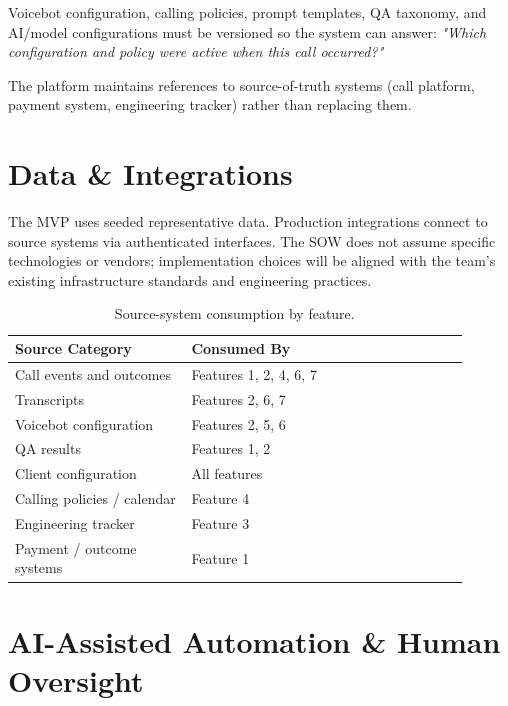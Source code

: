 \documentclass[11pt,a4paper]{article}
\begin{document}
Voicebot configuration, calling policies, prompt templates, QA taxonomy, and AI/model configurations must be versioned so the system can answer: \emph{"Which configuration and policy were active when this call occurred?"}

The platform maintains references to source-of-truth systems (call platform, payment system, engineering tracker) rather than replacing them.

\section{Data \& Integrations}

The MVP uses seeded representative data. Production integrations connect to source systems via authenticated interfaces. The SOW does not assume specific technologies or vendors; implementation choices will be aligned with the team's existing infrastructure standards and engineering practices.

\begin{table}[H]
\centering
\small
\begin{tabular}{p{0.35\linewidth}p{0.55\linewidth}}
\toprule
\textbf{Source Category} & \textbf{Consumed By} \\
\midrule
Call events and outcomes    & Features 1, 2, 4, 6, 7 \\
Transcripts                 & Features 2, 6, 7 \\
Voicebot configuration      & Features 2, 5, 6 \\
QA results                  & Features 1, 2 \\
Client configuration        & All features \\
Calling policies / calendar & Feature 4 \\
Engineering tracker         & Feature 3 \\
Payment / outcome systems   & Feature 1 \\
\bottomrule
\end{tabular}
\caption{Source-system consumption by feature.}
\end{table}

\section{AI-Assisted Automation \& Human Oversight}
\end{document}
